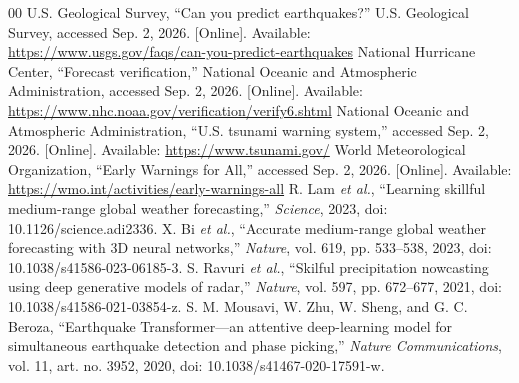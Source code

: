 \documentclass[conference]{IEEEtran}
\begin{document}
\begin{thebibliography}{00}
 U.S. Geological Survey, ``Can you predict earthquakes?'' U.S. Geological Survey, accessed Sep. 2, 2026. [Online]. Available: \url{https://www.usgs.gov/faqs/can-you-predict-earthquakes}
 National Hurricane Center, ``Forecast verification,'' National Oceanic and Atmospheric Administration, accessed Sep. 2, 2026. [Online]. Available: \url{https://www.nhc.noaa.gov/verification/verify6.shtml}
 National Oceanic and Atmospheric Administration, ``U.S. tsunami warning system,'' accessed Sep. 2, 2026. [Online]. Available: \url{https://www.tsunami.gov/}
 World Meteorological Organization, ``Early Warnings for All,'' accessed Sep. 2, 2026. [Online]. Available: \url{https://wmo.int/activities/early-warnings-all}
 R. Lam \textit{et al.}, ``Learning skillful medium-range global weather forecasting,'' \textit{Science}, 2023, doi: 10.1126/science.adi2336.
 X. Bi \textit{et al.}, ``Accurate medium-range global weather forecasting with 3D neural networks,'' \textit{Nature}, vol. 619, pp. 533--538, 2023, doi: 10.1038/s41586-023-06185-3.
 S. Ravuri \textit{et al.}, ``Skilful precipitation nowcasting using deep generative models of radar,'' \textit{Nature}, vol. 597, pp. 672--677, 2021, doi: 10.1038/s41586-021-03854-z.
 S. M. Mousavi, W. Zhu, W. Sheng, and G. C. Beroza, ``Earthquake Transformer---an attentive deep-learning model for simultaneous earthquake detection and phase picking,'' \textit{Nature Communications}, vol. 11, art. no. 3952, 2020, doi: 10.1038/s41467-020-17591-w.
\end{thebibliography}
\end{document}
